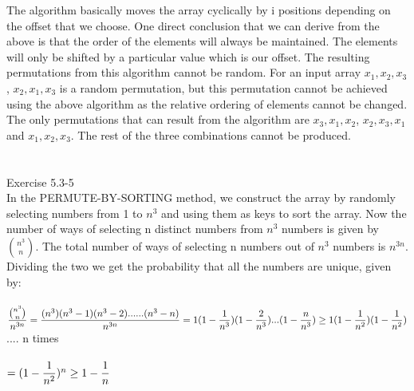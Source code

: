 \documentclass[10pt]{article}
\begin{document}
The algorithm basically moves the array cyclically by i positions depending on the offset that we choose. One direct conclusion that we can derive from the above is that the order of the elements will always be maintained. The elements will only be shifted by a particular value which is our offset. The resulting permutations from this algorithm cannot be random. For an input array $x_1, x_2, x_3$, $x_2, x_1, x_3$ is a random permutation, but this permutation cannot be achieved using the above algorithm as the relative ordering of elements cannot be changed. The only permutations that can result from the algorithm are $x_3, x_1, x_2$, $x_2, x_3, x_1$ and $x_1, x_2, x_3$. The rest of the three combinations cannot be produced.\\\\\\
Exercise 5.3-5\\
In the PERMUTE-BY-SORTING method, we construct the array by randomly selecting numbers from 1 to $n^3$ and using them as keys to sort the array. Now the number of ways of selecting n distinct numbers from $n^3$ numbers is given by $n^3\choose n$. The total number of ways of selecting n numbers out of $n^3$ numbers is $n^{3n}$. Dividing the two we get the probability that all the numbers are unique, given by:\\\\
$\dfrac{\binom{n^3}{n}}{n^{3n}} = \dfrac{(n^3)(n^3-1)(n^3-2)......(n^3-n)}{n^{3n}}\\\\ = 1(1-\dfrac{1}{n^3})(1-\dfrac{2}{n^3})...(1-\dfrac{n}{n^3})\\\\
\geq 1(1-\dfrac{1}{n^2})(1-\dfrac{1}{n^2})$ .... n times\\\\
$= (1 - \dfrac{1}{n^2})^n \\\\
\geq 1- \dfrac{1}{n}$
\end{document}
